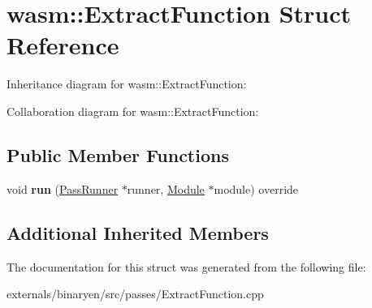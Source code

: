 \hypertarget{structwasm_1_1_extract_function}{}\section{wasm\+:\+:Extract\+Function Struct Reference}
\label{structwasm_1_1_extract_function}


Inheritance diagram for wasm\+:\+:Extract\+Function\+:


Collaboration diagram for wasm\+:\+:Extract\+Function\+:
\subsection*{Public Member Functions}
\begin{DoxyCompactItemize}
\item 
\mbox{\label{structwasm_1_1_extract_function_a7d29b19f1faa8cd2b725e5d850db57db}} 
void {\bfseries run} (\mbox{\hyperlink{structwasm_1_1_pass_runner}{Pass\+Runner}} $\ast$runner, \mbox{\hyperlink{classwasm_1_1_module}{Module}} $\ast$module) override
\end{DoxyCompactItemize}
\subsection*{Additional Inherited Members}


The documentation for this struct was generated from the following file\+:\begin{DoxyCompactItemize}
\item 
externals/binaryen/src/passes/Extract\+Function.\+cpp\end{DoxyCompactItemize}
